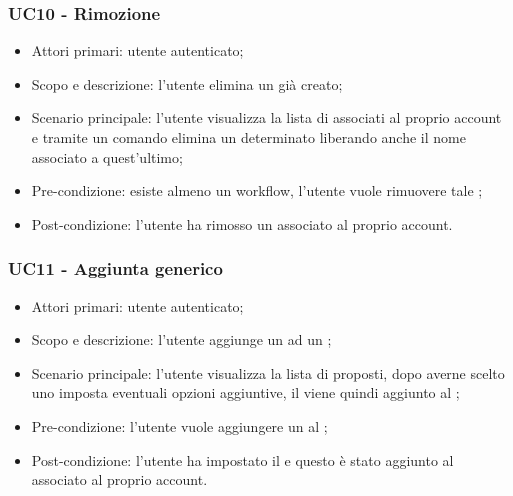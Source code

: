 \subsubsection{UC10 - Rimozione }
\begin{itemize}
	\item  Attori primari: utente autenticato;
	\item  Scopo e descrizione: l'utente elimina un  già creato;
	\item  Scenario principale: l'utente visualizza la lista di  associati al proprio account e tramite un comando elimina un determinato  liberando anche il nome associato a quest'ultimo;
	\item  Pre-condizione: esiste almeno un workflow, l'utente vuole rimuovere tale ;
	\item  Post-condizione: l'utente ha rimosso un  associato al proprio account.
\end{itemize}
\subsubsection{UC11 - Aggiunta  generico}
\begin{itemize}
	\item  Attori primari: utente autenticato;
	\item  Scopo e descrizione: l'utente aggiunge un  ad un ;
	\item  Scenario principale: l'utente visualizza la lista di  proposti, dopo averne scelto uno imposta eventuali opzioni aggiuntive, il  viene quindi aggiunto al ;
	\item  Pre-condizione: l'utente vuole aggiungere un  al ;
	\item  Post-condizione: l'utente ha impostato il  e questo è stato aggiunto al  associato al proprio account.
\end{itemize}
